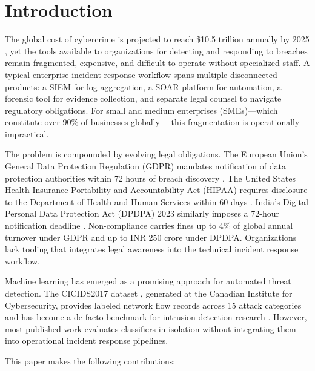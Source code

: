 \documentclass[conference]{IEEEtran}
\begin{document}
\section{Introduction}

The global cost of cybercrime is projected to reach \$10.5 trillion annually by 2025 \cite{morgan2020cybercrime}, yet the tools available to organizations for detecting and responding to breaches remain fragmented, expensive, and difficult to operate without specialized staff. A typical enterprise incident response workflow spans multiple disconnected products: a SIEM for log aggregation, a SOAR platform for automation, a forensic tool for evidence collection, and separate legal counsel to navigate regulatory obligations. For small and medium enterprises (SMEs)—which constitute over 90\% of businesses globally \cite{oecd2021}—this fragmentation is operationally impractical.

The problem is compounded by evolving legal obligations. The European Union's General Data Protection Regulation (GDPR) mandates notification of data protection authorities within 72 hours of breach discovery \cite{voigt2017eu}. The United States Health Insurance Portability and Accountability Act (HIPAA) requires disclosure to the Department of Health and Human Services within 60 days \cite{annas2003hipaa}. India's Digital Personal Data Protection Act (DPDPA) 2023 similarly imposes a 72-hour notification deadline \cite{dpdpa2023}. Non-compliance carries fines up to 4\% of global annual turnover under GDPR and up to INR 250 crore under DPDPA. Organizations lack tooling that integrates legal awareness into the technical incident response workflow.

Machine learning has emerged as a promising approach for automated threat detection. The CICIDS2017 dataset \cite{sharafaldin2018cicids}, generated at the Canadian Institute for Cybersecurity, provides labeled network flow records across 15 attack categories and has become a de facto benchmark for intrusion detection research \cite{panigrahi2018survey}. However, most published work evaluates classifiers in isolation without integrating them into operational incident response pipelines.

This paper makes the following contributions:
\end{document}
